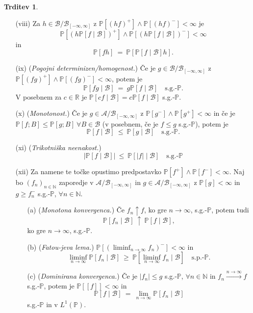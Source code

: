 \documentclass[11pt]{article}
\newcommand{\R}{\mathbb{R}}
\newcommand{\N}{\mathbb{N}}
\renewcommand{\P}{\mathbb{P}}
\newcommand{\A}{\mathcal{A}}
\newcommand{\BB}{\mathcal{B}}
\newcommand{\B}{\mathscr{B}}
\newcommand{\1}{\mathbbm{1}}
\newcommand{\rr}{[-\infty,\infty]}
\theoremstyle{definition}
\theoremstyle{definition}
\newtheorem{trditev}{Trditev}[section]
\theoremstyle{definition}
\theoremstyle{definition}
\begin{document}
\begin{trditev}
\begin{enumerate}
\item[(viii)] Za $h \in \BB/\B_{\rr}$ z $\P[(hf)^+]\wedge\P[(hf)^-]<\infty$ je
$$\P[(h\P[f \mid \BB])^+]\wedge\P[(h\P[f \mid \BB])^-]<\infty$$ 
in
$$\P[fh] ~=~ \P[\P[f \mid \BB]h].$$

\item[(ix)] (\textit{Pogojni determinizen/homogenost.}) Če je $g \in \BB/\B_{\rr}$ z $\P[(fg)^+]\wedge\P[(fg)^-]<\infty$, potem je
$$\P[fg \mid \BB] ~=~ g\P[f \mid \BB] \quad \text{s.g.-}\P.$$
V posebnem za $c \in \R$ je $\P[cf \mid \BB] = c\P[f \mid \BB]$ s.g.-$\P$.

\item[(x)] (\textit{Monotonost.}) Če je $g \in \A/\B_{\rr}$ z $\P[g^-]\wedge\P[g^+]<\infty$ in če je $\P[f;B] \leq \P[g;B] ~\forall B \in \BB$ (v posebnem, če je $f\leq g$ s.g.-$\P$), potem je
$$\P[f \mid \BB] ~\leq~ \P[g \mid \BB] \quad \text{s.g.-}\P.$$

\item[(xi)] (\textit{Trikotniška neenakost.})
$$|\P[f \mid \BB]| ~\leq~ \P[|f| \mid \BB] \quad \text{s.g.-}\P$$

\item[(xii)] Za namene te točke opustimo predpostavko $\P[f^+]\wedge\P[f^-]<\infty$. Naj bo $(f_n)_{n \in \N}$ zaporedje v $\A/\B_{\rr}$ in $g \in \A/\B_{\rr}$ z $\P[g]<\infty$ in $g \geq f_n^-$ s.g.-$\P$, $\forall n \in \N$.
\begin{itemize}
	\item[(a)] (\textit{Monotona konvergenca.}) Če $f_n \uparrow f$, ko gre $n \rightarrow \infty$, s.g.-$\P$, potem tudi
	$$\P[f_n \mid \BB] ~\uparrow~ \P[f \mid \BB],$$
	ko gre $n \rightarrow \infty$, s.g.-$\P$.
	\item[(b)] (\textit{Fatou-jeva lema.})
	$\P[(\liminf_{n \rightarrow\infty}f_n)^-]<\infty$ in
	$$\liminf_{n \rightarrow \infty} \P[f_n \mid \BB] ~\geq~ \P[\liminf_{n \rightarrow \infty} f_n \mid \BB] \quad \text{s.p.-}\P.$$
	\item[(c)] (\textit{Dominirana konvergenca.}) Če je $|f_n| \leq g$ s.g.-$\P$, $\forall n \in \N$ in $f_n \xrightarrow{n \rightarrow \infty} f$ s.g.-$\P$, potem je $\P[[f]]<\infty$ in
	$$\P[f \mid \BB] ~=~ \lim_{n \rightarrow \infty} \P[f_n \mid \BB]$$
	s.g.-$\P$ in v $L^1(\P)$. 
\end{itemize}


\end{enumerate}
\end{trditev}
\end{document}
